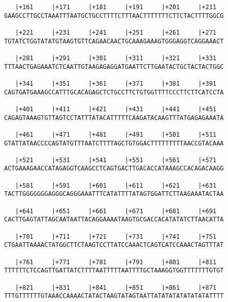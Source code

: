 \documentclass{article}
\begin{document}
\begin{Verbatim}
   |+161     |+171     |+181     |+191     |+201     |+211  
GAAGCCTTGCCTAAATTTAATGCTGCCTTTTCTTTAACTTTTTTTCTTCTACTTTTGGCG
                                                            
   |+221     |+231     |+241     |+251     |+261     |+271  
TGTATCTGGTATATGTAAGTGTTCAGAACAACTGCAAAGAAAGTGGGAGGTCAGGAAACT
                                                            
   |+281     |+291     |+301     |+311     |+321     |+331  
TTTAACTGAGAAATCTCAATTGTAAGAGAGGATGAATTCTTGAATACTGCTACTACTGGC
                                                            
   |+341     |+351     |+361     |+371     |+381     |+391  
CAGTGATGAAAGCCATTTGCACAGAGCTCTGCCTTCTGTGGTTTTCCCTTCTTCATCCTA
                                                            
   |+401     |+411     |+421     |+431     |+441     |+451  
CAGAGTAAAGTGTTAGTCCTATTTATACATTTTTCAAGATACAAGTTTATGAGAGAAATA
                                                            
   |+461     |+471     |+481     |+491     |+501     |+511  
GTATTATAACCCCAGTATGTTTAATCTTTTAGCTGTGGACTTTTTTTTTAACCGTACAAA
                                                            
   |+521     |+531     |+541     |+551     |+561     |+571  
ACTGAAAGAACCATAGAGGTCAAGCCTCAGTGACTTGACACCATAAAGCCACAGACAAGG
                                                            
   |+581     |+591     |+601     |+611     |+621     |+631  
TACTTGGGGGGGAGGGCAGGGAAATTTCATATTTTATAGTGGATTCTTAAGAAATACTAA
                                                            
   |+641     |+651     |+661     |+671     |+681     |+691  
CACTTGAGTATTAGCAATAATTACAGGAAAATAAGTGCGACCACATATATCTTAACATTA
                                                            
   |+701     |+711     |+721     |+731     |+741     |+751  
CTGAATTAAAACTATGGCTTCTAAGTCCTTATCCAAACTCAGTCATCCAAACTAGTTTAT
                                                            
   |+761     |+771     |+781     |+791     |+801     |+811  
TTTTTTCTCCAGTTGATTATCTTTTAATTTTTAATTTTGCTAAAGGTGGTTTTTTTGTGT
                                                            
   |+821     |+831     |+841     |+851     |+861     |+871  
TTTGTTTTTTGTAAACCAAAACTATACTAAGTATAGTAATTATATATATATATATATTTT
                                                            

\end{Verbatim}
\end{document}
